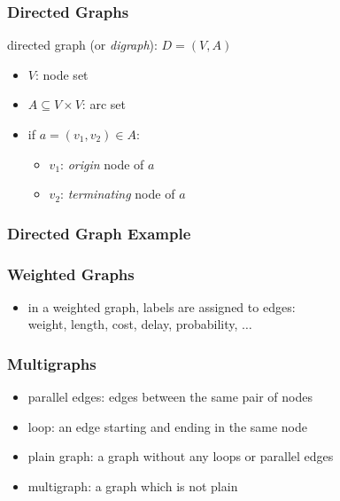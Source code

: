 \documentclass[dvipsnames]{beamer}
\begin{document}
\begin{frame}
  \frametitle{Directed Graphs}

  \begin{definition}
    \alert{directed graph} (or \emph{digraph}): $D=(V,A)$

    \begin{itemize}
      \item $V$: node set
      \item $A \subseteq V \times V$: \alert{arc} set
    \end{itemize}
  \end{definition}

  \begin{itemize}
    \item if $a=(v_1,v_2) \in A$:
    \begin{itemize}
      \item $v_1$: \emph{origin} node of $a$
      \item $v_2$: \emph{terminating} node of $a$
    \end{itemize}
  \end{itemize}
\end{frame}

\begin{frame}
  \frametitle{Directed Graph Example}

  \begin{example}
    \begin{center}
    \end{center}
  \end{example}
\end{frame}

\begin{frame}
  \frametitle{Weighted Graphs}

  \begin{itemize}
    \item in a weighted graph, labels are assigned to edges:\\
      weight, length, cost, delay, probability, $\ldots$
  \end{itemize}
\end{frame}

\begin{frame}
  \frametitle{Multigraphs}

  \begin{itemize}
    \item \alert{parallel edges}: edges between the same pair of nodes
    \item \alert{loop}: an edge starting and ending in the same node

    \pause
    \bigskip
    \item \alert{plain} graph: a graph without any loops or parallel edges
    \item \alert{multigraph}: a graph which is not plain
  \end{itemize}
\end{frame}
\end{document}

